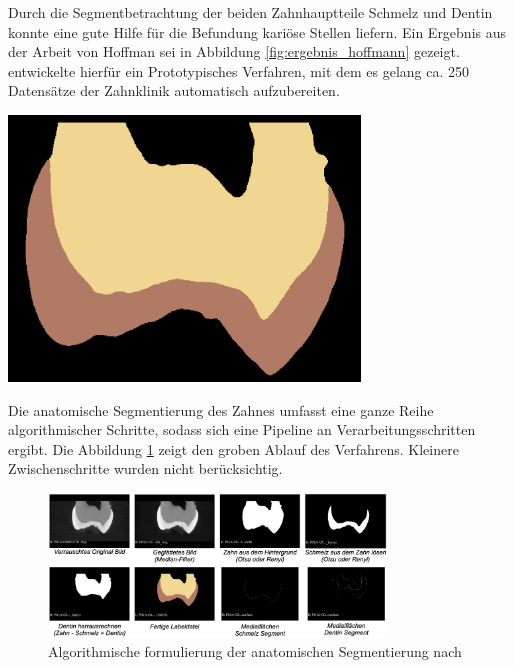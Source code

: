\begin{minipage}{0.45\textwidth}
	Durch die Segmentbetrachtung der beiden Zahnhauptteile Schmelz und Dentin konnte
	\citet{hoffmann2020} eine gute Hilfe für die Befundung kariöse Stellen liefern.
	Ein Ergebnis aus der Arbeit von Hoffman sei in Abbildung \ref{fig:ergebnis_hoffmann}
	gezeigt. \citet{hoffmann2020} entwickelte hierfür ein Prototypisches Verfahren,
	mit dem es gelang ca. 250 Datensätze der Zahnklinik automatisch aufzubereiten.
\end{minipage}
\hfill
\begin{minipage}{0.45\textwidth}
	\centering
	\includegraphics[width=0.7\textwidth]{img/ergebnis_hoffmann_2.jpg}
	\label{fig:ergebnis_hoffmann}
\end{minipage}

Die anatomische Segmentierung des Zahnes umfasst eine ganze Reihe algorithmischer
Schritte, sodass sich eine Pipeline an Verarbeitungsschritten ergibt. Die Abbildung
\ref{fig:anatomische_segmentierung} zeigt den groben Ablauf des Verfahrens.
Kleinere Zwischenschritte wurden nicht berücksichtig.

\begin{figure}[h]
	\centering
	\includegraphics[width=0.8\textwidth]{img/anatomischeSegmentierung.png}
	\caption{Algorithmische formulierung der anatomischen Segmentierung nach
	\citet{hoffmann2020}}
	\label{fig:anatomische_segmentierung}
\end{figure}

